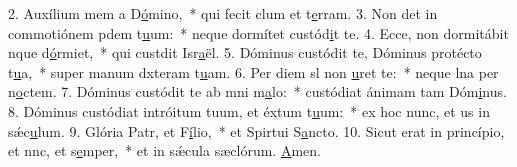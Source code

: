 2. Auxílium mem a D\uline{ó}mino,~* qui fecit clum et t\uline{e}rram.
3. Non det in commotiónem pdem t\uline{u}um:~* neque dormítet  custód\uline{i}t te.
4. Ecce, non dormitábit nque d\uline{ó}rmiet,~* qui custdit Isr\uline{a}ël.
5. Dóminus custódit te, Dóminus protécto t\uline{u}a,~* super manum dxteram t\uline{u}am.
6. Per diem sl non \uline{u}ret te:~* neque lna per n\uline{o}ctem.
7. Dóminus custódit te ab mni m\uline{a}lo:~* custódiat ánimam tam Dóm\uline{i}nus.
8. Dóminus custódiat intróitum tuum, et éxtum t\uline{u}um:~* ex hoc nunc, et us in sǽc\uline{u}lum.
9. Glória Patr, et F\uline{í}lio,~* et Spirtui S\uline{a}ncto.
10. Sicut erat in princípio, et nnc, et s\uline{e}mper,~* et in sǽcula sæclórum. \uline{A}men.
